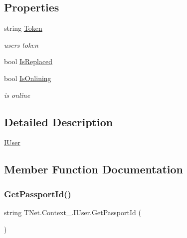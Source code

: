 \subsection*{Properties}
\begin{DoxyCompactItemize}
\item 
string \mbox{\hyperlink{interface_t_net_1_1_context___1_1_i_user_a649399846ac58cb2c3d88887d48f2b9d}{Token}}
\begin{DoxyCompactList}\small\item\em user\textquotesingle{}s token \end{DoxyCompactList}\item 
bool \mbox{\hyperlink{interface_t_net_1_1_context___1_1_i_user_a1a44b5a44bc7f2da674739868b688de6}{Is\+Replaced}}
\item 
bool \mbox{\hyperlink{interface_t_net_1_1_context___1_1_i_user_afc7ce8dbb54aacad3b1e0435fa1eb99d}{Is\+Onlining}}
\begin{DoxyCompactList}\small\item\em is online \end{DoxyCompactList}\end{DoxyCompactItemize}


\subsection{Detailed Description}
\mbox{\hyperlink{interface_t_net_1_1_context___1_1_i_user}{I\+User}} 



\subsection{Member Function Documentation}
\mbox{\label{interface_t_net_1_1_context___1_1_i_user_a5c994a142a4d5981d7de87f5cd93d134}} 
\subsubsection{\texorpdfstring{Get\+Passport\+Id()}{GetPassportId()}}
{\footnotesize\ttfamily string T\+Net.\+Context\+\_\+.\+I\+User.\+Get\+Passport\+Id (\begin{DoxyParamCaption}{ }\end{DoxyParamCaption})}



